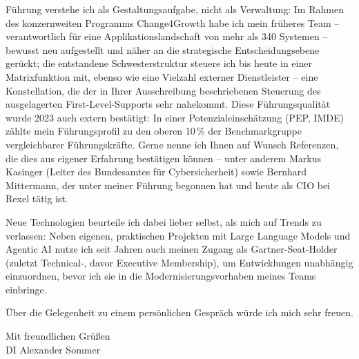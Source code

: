 \documentclass[11pt]{article}
\begin{document}
Führung verstehe ich als Gestaltungsaufgabe, nicht als Verwaltung: Im Rahmen des konzernweiten Programms Change4Growth habe ich mein früheres Team -- verantwortlich für eine Applikationslandschaft von mehr als 340 Systemen -- bewusst neu aufgestellt und näher an die strategische Entscheidungsebene gerückt; die entstandene Schwesterstruktur steuere ich bis heute in einer Matrixfunktion mit, ebenso wie eine Vielzahl externer Dienstleister -- eine Konstellation, die der in Ihrer Ausschreibung beschriebenen Steuerung des ausgelagerten First-Level-Supports sehr nahekommt. Diese Führungsqualität wurde 2023 auch extern bestätigt: In einer Potenzialeinschätzung (PEP, IMDE) zählte mein Führungsprofil zu den oberen 10\,\% der Benchmarkgruppe vergleichbarer Führungskräfte. Gerne nenne ich Ihnen auf Wunsch Referenzen, die dies aus eigener Erfahrung bestätigen können -- unter anderem Markus Kasinger (Leiter des Bundesamtes für Cybersicherheit) sowie Bernhard Mittermann, der unter meiner Führung begonnen hat und heute als CIO bei Rexel tätig ist.

Neue Technologien beurteile ich dabei lieber selbst, als mich auf Trends zu verlassen: Neben eigenen, praktischen Projekten mit Large Language Models und Agentic AI nutze ich seit Jahren auch meinen Zugang als Gartner-Seat-Holder (zuletzt Technical-, davor Executive Membership), um Entwicklungen unabhängig einzuordnen, bevor ich sie in die Modernisierungsvorhaben meines Teams einbringe.

Über die Gelegenheit zu einem persönlichen Gespräch würde ich mich sehr freuen.

\vspace{6pt}
Mit freundlichen Grüßen\\[14pt]
DI Alexander Sommer
\end{document}
